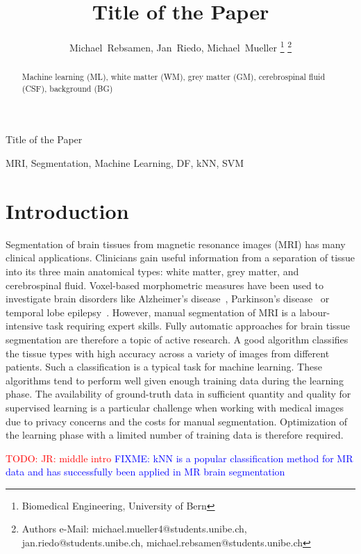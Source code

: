 \documentclass[journal]{IEEEtran}
\newcommand\TODO[1]{\textcolor{red}{TODO: #1}}
\newcommand\FIXME[1]{\textcolor{blue}{FIXME: #1}}
\begin{document}
\title{Title of the Paper}


\author{Michael~Rebsamen,
        Jan~Riedo,
        Michael~Mueller%
\thanks{Biomedical Engineering, University of Bern}%
\thanks{Authors e-Mail: michael.mueller4@students.unibe.ch, jan.riedo@students.unibe.ch, michael.rebsamen@students.unibe.ch}}%
%
{Title of the Paper}
\maketitle

\begin{abstract}
Machine learning (ML), white matter (WM), grey matter (GM), cerebrospinal fluid (CSF), background (BG)
\end{abstract}
\begin{IEEEkeywords}
MRI, Segmentation, Machine Learning, DF, kNN, SVM
\end{IEEEkeywords}


\section{Introduction}
Segmentation of brain tissues from magnetic resonance images (MRI) has many clinical applications. Clinicians gain useful information from a separation of tissue into its three main anatomical types: white matter, grey matter, and cerebrospinal fluid. Voxel-based morphometric measures have been used to investigate brain disorders like Alzheimer’s disease~\cite{busatto2003voxel}, Parkinson's disease~\cite{price2004voxel} or temporal lobe epilepsy~\cite{rummel2017personalized}. However, manual segmentation of MRI is a labour-intensive task requiring expert skills. Fully automatic approaches for brain tissue segmentation are therefore a topic of active research. A good algorithm classifies the tissue types with high accuracy across a variety of images from different patients. Such a classification is a typical task for machine learning. These algorithms tend to perform well given enough training data during the learning phase. The availability of ground-truth data in sufficient quantity and quality for supervised learning is a particular challenge when working with medical images due to privacy concerns and the costs for manual segmentation. Optimization of the learning phase with a limited number of training data is therefore required.

\TODO{JR: middle intro}
\FIXME{kNN is a popular classification method for MR data and has successfully been applied in MR brain segmentation\cite{Anbeek2004,Cocosco2003,Warfield2000}}
\end{document}
